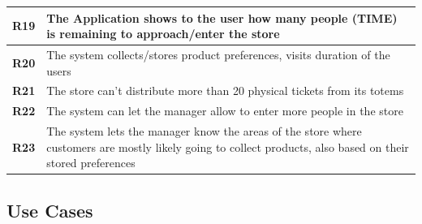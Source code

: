 \documentclass[]{article}
\begin{document}
			\begin{tabular}{|c|l|}
				\hline			
				\textbf{R19} & 
					\begin{minipage}[t]{13cm}
						The Application shows to the user how many people (TIME) is remaining to approach/enter the store
					\end{minipage}
				\\ \hline				
				\textbf{R20} & 
					\begin{minipage}[t]{13cm}
						The system collects/stores product preferences, visits duration of the users							\end{minipage}
				\\ \hline				
				\textbf{R21} & 
					\begin{minipage}[t]{13cm}
						The store can’t distribute more than 20 physical tickets from its totems
					\end{minipage}
				\\ \hline				
				\textbf{R22} & 
					\begin{minipage}[t]{13cm}
						The system can let the manager allow to enter more people in the store
					\end{minipage}
				\\ \hline				
				\textbf{R23} & 
					\begin{minipage}[t]{13cm}
						The system lets the manager know the areas of the store where customers are mostly likely going to collect products, also based on their stored preferences
					\end{minipage}
				\\ \hline				
				
			\end{tabular}
			\newpage

		
		\subsection{Use Cases}
		
\end{document}
